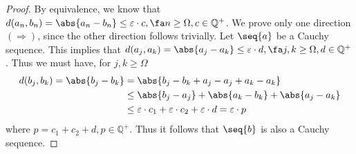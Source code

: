 {
\begin{proof}
    By equivalence, we know that $d(a_n, b_n)=\abs{a_n-b_n} \leq \varepsilon \cdot c, \fa n \geq \Omega, c \in \mathbb{Q}^+$. We prove only one direction $(\Rightarrow)$, since the other direction follows trivially. 
    Let $\seq{a}$ be a Cauchy sequence. This implies that $d(a_j, a_k)=\abs{a_j-a_k} \leq \varepsilon \cdot d, \fa j,k \geq \Omega, d \in \mathbb{Q}^+$.
    Thus we must have, for $j,k \geq \Omega$
    \begin{align*}
        d(b_j, b_k) = \abs{b_j-b_k} &= \abs{b_j-b_k +a_j-a_j +a_k-a_k} \\
        & \leq \abs{b_j -a_j} + \abs{a_k-b_k} + \abs{a_j-a_k} \\
        & \leq \varepsilon \cdot c_1 + \varepsilon \cdot c_2 + \varepsilon \cdot d = \varepsilon \cdot p
    \end{align*}
    where $p=c_1+c_2+d, p\in \mathbb{Q}^+$. Thus it follows that $\seq{b}$ is also a Cauchy sequence.
\end{proof}

}
